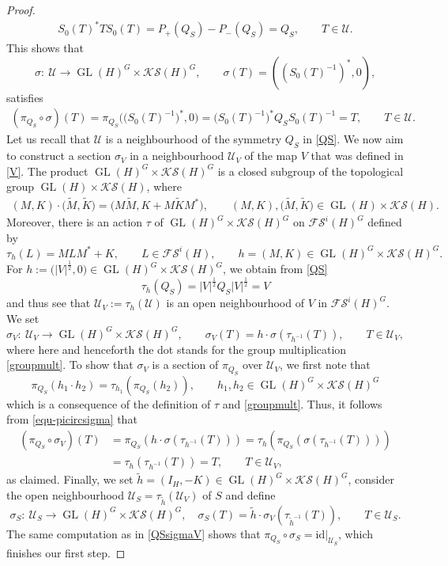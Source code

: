\documentclass[10pt,a4paper]{amsart}
\DeclareMathOperator{\GL}{GL}
\begin{document}
\begin{proof}
\begin{align*}
S_0(T)^\ast TS_0(T)=P_+(Q_S)-P_-(Q_S)=Q_S,\qquad T\in\mathcal{U}.
\end{align*}
This shows that
\[\sigma \colon \ \mathcal{U}\rightarrow\GL(H)^G\times\mathcal{KS}(H)^G,\qquad \sigma(T)=((S_0(T)^{-1})^\ast,0),\]
satisfies
\begin{align}\label{equ-picircsigma}
(\pi_{Q_S}\circ\sigma)(T)=\pi_{Q_S}\bigl(\bigl(S_0(T)^{-1}\bigr)^\ast,0\bigr)=\bigl(S_0(T)^{-1}\bigr)^\ast Q_S S_0(T)^{-1}=T,\qquad T\in\mathcal{U}.
\end{align}
Let us recall that $\mathcal{U}$ is a neighbourhood of the symmetry $Q_S$ in \eqref{QS}. We now aim to construct a section $\sigma_V$ in a neighbourhood $\mathcal{U}_V$ of the map $V$ that was defined in \eqref{V}. The product $\GL(H)^G\times\mathcal{KS}(H)^G$ is a closed subgroup of the topological group $\GL(H)\times\mathcal{KS}(H)$, where
\begin{align}\label{groupmult}
(M,K)\cdot \bigl(\tilde{M},\tilde{K}\bigr)=\bigl(M\tilde{M}, K+M\tilde{K}M^\ast\bigr),\qquad (M,K), \bigl(\tilde{M},\tilde{K}\bigr)\in\GL(H)\times\mathcal{KS}(H).
\end{align}
Moreover, there is an action $\tau$ of $\GL(H)^G\times\mathcal{KS}(H)^G$ on $\mathcal{FS}^i(H)^G$ defined by
\[\tau_{h}(L)= MLM^\ast+K,\qquad L\in\mathcal{FS}^i(H),\qquad h=(M,K)\in\GL(H)^G\times\mathcal{KS}(H)^G.\]
For $h:=\bigl(|V|^\frac{1}{2},0\bigr)\in \GL(H)^G\times\mathcal{KS}(H)^G$, we obtain from \eqref{QS}
\[\tau_h(Q_S)=|V|^\frac{1}{2}Q_S|V|^\frac{1}{2}=V\]
and thus see that $\mathcal{U}_V:=\tau_h(\mathcal{U})$ is an open neighbourhood of $V$ in $\mathcal{FS}^i(H)^G$. We set
\[\sigma_V \colon \ \mathcal{U}_V\rightarrow \GL(H)^G\times\mathcal{KS}(H)^G,\qquad \sigma_V(T)=h\cdot \sigma(\tau_{h^{-1}}(T)),\qquad T\in\mathcal{U}_V,\]
where here and henceforth the dot stands for the group multiplication \eqref{groupmult}. To show that $\sigma_V$ is a section of $\pi_{Q_S}$ over $\mathcal{U}_V$, we first note that
\[\pi_{Q_S}(h_1\cdot h_2)=\tau_{h_1}(\pi_{Q_S}(h_2)),\qquad h_1,h_2\in \GL(H)^G\times\mathcal{KS}(H)^G\]
which is a consequence of the definition of $\tau$ and \eqref{groupmult}. Thus, it follows from \eqref{equ-picircsigma} that
\begin{align}
(\pi_{Q_S}\circ\sigma_V)(T)&=\pi_{Q_S}(h\cdot \sigma(\tau_{h^{-1}}(T)))=\tau_h(\pi_{Q_S}(\sigma(\tau_{h^{-1}}(T))))\nonumber\\
&=\tau_h(\tau_{h^{-1}}(T))=T,\qquad T\in\mathcal{U}_V,\label{QSsigmaV}
\end{align}
as claimed. Finally, we set $\tilde{h}=(I_H,-K)\in \GL(H)^G\times\mathcal{KS}(H)^G$, consider the open neighbourhood $\mathcal{U}_S=\tau_{\tilde{h}}(\mathcal{U}_V)$ of $S$ and define
\[\sigma_S\colon \ \mathcal{U}_S\rightarrow \GL(H)^G\times\mathcal{KS}(H)^G,\quad \sigma_S(T)=\tilde{h}\cdot \sigma_V(\tau_{\tilde{h}^{-1}}(T)),\qquad T\in\mathcal{U}_S.\]
The same computation as in \eqref{QSsigmaV} shows that $\pi_{Q_S}\circ\sigma_S=\mathrm{id}|_{\mathcal{U}_S}$, which finishes our first step.


\end{proof}
\end{document}

